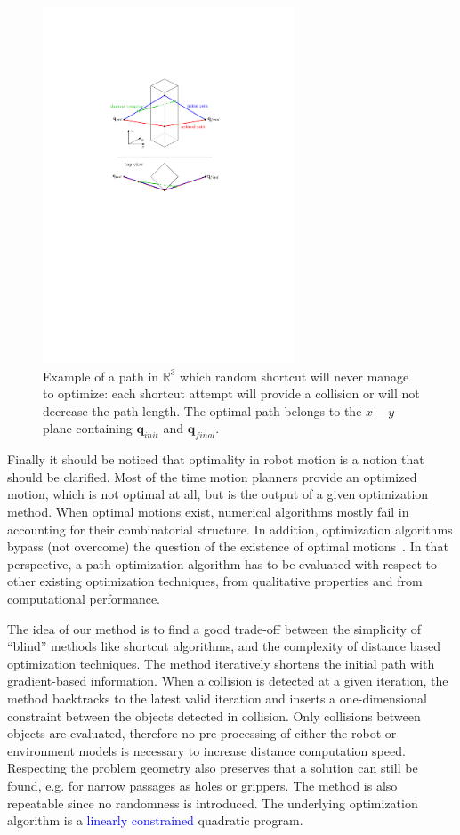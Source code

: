 \documentclass{tADR2e}
\newcommand\real{\mathbb{R}}
\newcommand\conf{\mathbf{q}}
\begin{document}
\begin{figure}
	\centering
	\includegraphics[width=7.5cm]{decoupled_DOF_optimization.pdf}
	\caption{Example of a path in $\real^3$ which random shortcut will never manage to 
	optimize: each shortcut attempt will provide a collision or will not 
	decrease the path length. The optimal path belongs to the $x-y$ plane 
	containing $\conf_{init}$ and $\conf_{final}$.}
	\label{decoupled_DOF_optimization}
\end{figure}



Finally it should be noticed that optimality in robot motion is a notion that should be clarified. Most of the 
time motion planners provide an optimized motion, which is not optimal at all, but is the output of a given 
optimization method. When optimal motions exist, numerical
algorithms mostly fail in accounting for their combinatorial structure. In addition, optimization algorithms 
bypass (not overcome) the question of the existence of optimal motions~\cite{LaumondOptim}. In that perspective, 
a path optimization algorithm has to be evaluated with respect to other existing optimization techniques, 
from qualitative properties and from computational performance.

The idea of our method is to find a good trade-off between
the simplicity of “blind” methods like shortcut algorithms,
and the complexity of distance based optimization techniques.
The method iteratively shortens the initial path with gradient-based information.
When a collision is detected at a given iteration, the method backtracks to the
latest valid iteration and inserts a one-dimensional constraint
between the objects detected in collision. Only collisions between objects are 
evaluated, therefore no pre-processing of either the
robot or environment models is necessary to increase distance computation speed. 
Respecting the problem geometry also 
preserves that a solution can still be found, e.g. for narrow passages as holes or 
grippers. The method is also repeatable since no randomness is introduced. The underlying optimization algorithm is a \textcolor{blue}{linearly constrained} quadratic program.
\end{document}
